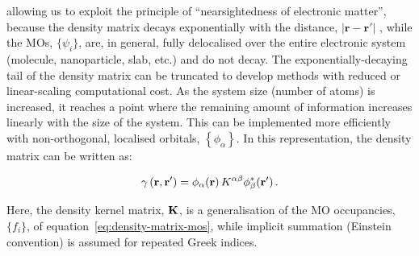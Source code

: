 \documentclass[../main.tex]{subfiles}
\begin{document}
allowing us to exploit the principle of ``nearsightedness of electronic matter'',\cite{Prodans2005} because the density matrix decays exponentially with the distance, $|\mathbf{r}-\mathbf{r'}|$ \cite{Prodans2005}, while the MOs, $\{ \psi_{i} \}$, are, in general, fully delocalised over the entire electronic system (molecule, nanoparticle, slab, etc.) and do not decay. 
The exponentially-decaying tail of the density matrix can be truncated to develop methods with reduced or linear-scaling computational cost. As the system size (number of atoms) is increased, it reaches a point where the remaining amount of information increases linearly with the size of the system. This can be implemented more efficiently with non-orthogonal, localised orbitals, $\left\{\phi_\alpha\right\}$.\cite{Galli1992, hernandez1995} In this representation, the density matrix can be written as:

\begin{equation}
    \gamma\left(\mathbf{r},\mathbf{r'}\right)=\phi_\alpha\!\left(\mathbf{r}\right) K^{\alpha\beta} \phi_\beta^*\!\left(\mathbf{r'}\right).
\end{equation}

Here, the density kernel matrix, $\bf K$, is a generalisation of the MO occupancies, $\{ f_i \}$, of equation~\ref{eq:density-matrix-mos}, while implicit summation (Einstein convention) is assumed for repeated Greek indices.
\end{document}
